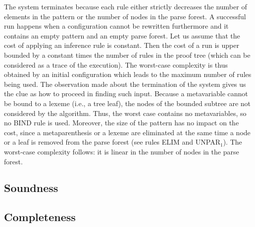 The system terminates because each rule either strictly decreases the
number of elements in the pattern or the number of nodes in the parse
forest. A successful run happens when a configuration cannot be
rewritten furthermore and it contains an empty pattern and an empty
parse forest. Let us assume that the cost of applying an inference
rule is constant. Then the cost of a run is upper bounded by a
constant times the number of rules in the proof tree (which can be
considered as a trace of the execution). The worst\hyp{}case
complexity is thus obtained by an initial configuration which leads to
the maximum number of rules being used. The observation made about the
termination of the system gives us the clue as how to proceed in
finding such input. Because a meta\-variable cannot be bound to a
lexeme (i.e., a tree leaf), the nodes of the bounded subtree are not
considered by the algorithm. Thus, the worst case contains no
meta\-variables, so no \textsf{BIND} rule is used. Moreover, the size
of the pattern has no impact on the cost, since a meta\-parenthesis or
a lexeme are eliminated at the same time a node or a leaf is removed
from the parse forest (see rules \textsf{ELIM} and
\textsf{UNPAR}\(_1\)). The worst\hyp{}case complexity follows: it is
linear in the number of nodes in the parse forest.

\subsection{Soundness}


\subsection{Completeness}

